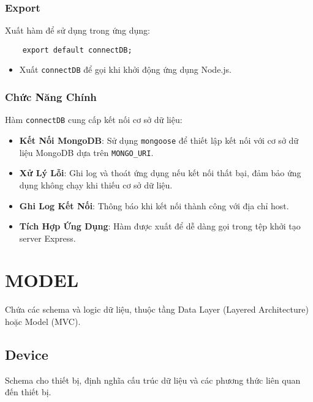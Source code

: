            \subsubsection{Export}
                \hspace*{0.6cm}Xuất hàm để sử dụng trong ứng dụng:
                \begin{lstlisting}
    export default connectDB;
                \end{lstlisting}
                \begin{itemize}
                    \item Xuất \texttt{connectDB} để gọi khi khởi động ứng dụng Node.js.
                \end{itemize}

            \subsubsection{Chức Năng Chính}
                \hspace*{0.6cm}Hàm \texttt{connectDB} cung cấp kết nối cơ sở dữ liệu:
                \begin{itemize}
                    \item \textbf{Kết Nối MongoDB}: Sử dụng \texttt{mongoose} để thiết lập kết nối với cơ sở dữ liệu MongoDB dựa trên \texttt{MONGO\_URI}.
                    \item \textbf{Xử Lý Lỗi}: Ghi log và thoát ứng dụng nếu kết nối thất bại, đảm bảo ứng dụng không chạy khi thiếu cơ sở dữ liệu.
                    \item \textbf{Ghi Log Kết Nối}: Thông báo khi kết nối thành công với địa chỉ host.
                    \item \textbf{Tích Hợp Ứng Dụng}: Hàm được xuất để dễ dàng gọi trong tệp khởi tạo server Express.
                \end{itemize}
    \section{MODEL}
        \hspace*{0.6cm}Chứa các schema và logic dữ liệu, thuộc tầng Data Layer (Layered Architecture) hoặc Model (MVC).
        \subsection{Device}
            \hspace*{0.6cm}Schema cho thiết bị, định nghĩa cấu trúc dữ liệu và các phương thức liên quan đến thiết bị.
